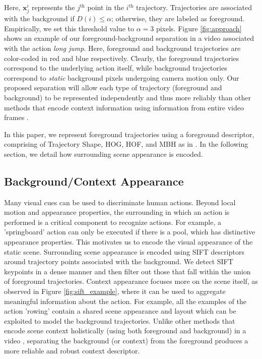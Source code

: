 \documentclass[runningheads]{llncs}
\begin{document}
Here, $\mathbf{x}_{j}^i$ represents the $j^{\text{th}}$ point in the $i^{\text{th}}$ trajectory. Trajectories are associated with the background if $D(i)\leq\alpha$; otherwise, they are labeled as foreground. Empirically, we set this threshold value to $\alpha=3$ pixels. Figure \ref{fig:approach} shows an example of our foreground-background separation in a video associated with the action \textit{long jump}. Here, foreground and background trajectories are color-coded in red and blue respectively. Clearly, the foreground trajectories correspond to the underlying action itself, while background trajectories correspond to \emph{static} background pixels undergoing camera motion only. Our proposed separation will allow each type of trajectory (foreground and background) to be represented independently and thus more reliably than other methods that encode context information using information from entire video frames \cite{marszalek2009}.

In this paper, we represent foreground trajectories using a foreground descriptor, comprising of Trajectory Shape, HOG, HOF, and MBH as in \cite{wang2013}. In the following section, we detail how surrounding scene appearance is encoded.




\subsection{Background/Context Appearance}
Many visual cues can be used to discriminate human actions. Beyond local motion and appearance properties, the surrounding in which an action is performed is a critical component to recognize actions. For example, a 'springboard' action can only be executed if there is a pool, which has distinctive appearance properties. This motivates us to encode the visual appearance of the static scene. Surrounding scene appearance is encoded using SIFT descriptors \cite{lowe2004} around trajectory points associated with the background. We detect SIFT keypoints in a dense manner and then filter out those that fall within the union of foreground trajectories. Context appearance focuses more on the scene itself, as observed in Figure \ref{fig:sift_example}, where it can be used to aggregate meaningful information about the action. For example, all the examples of the action 'rowing' contain a shared scene appearance and layout which can be exploited to model the background trajectories. Unlike other methods that encode scene context holistically (using both foreground and background) in a video \cite{marszalek2009}, separating the background (or context) from the foreground produces a more reliable and robust context descriptor.
\end{document}
